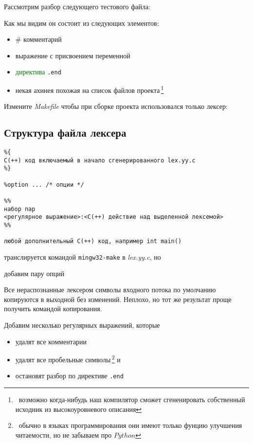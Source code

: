 \documentclass[oneside,10pt]{article}
\newcommand{\note}[1]{\,\footnote{\ #1}}
\newcommand{\term}[1]{\textcolor{green}{#1}}
\newcommand{\py}{$Python$}
\newcommand{\file}[1]{\textit{#1}}
\newcommand{\lst}[2]{}
\begin{document}
Рассмотрим разбор следующего тестового файла:
\lst{\file{src.src}: тест \#00}{doc/00.src}

\clearpage
Как мы видим он состоит из следующих элементов:
\begin{itemize}[nosep]
  \item \# комментарий
  \item выражение с присвоением переменной
  \item \term{директива} \verb|.end|
  \item некая ахинея похожая на список файлов проекта\note{возможно когда-нибудь
  наш компилятор сможет сгененировать собственный исходник из высокоуровневого
  описания}
\end{itemize}

\bigskip
Измените \file{Makefile} чтобы при сборке проекта использовался только лексер:
\lst{\file{Makefile}: изоляция лексера}{doc/01.mk}

\subsection{Структура файла лексера}

\begin{verbatim}
%{
С(++) код включаемый в начало сгенерированного lex.yy.c
%}

%option ... /* опции */

%%
набор пар
<регулярное выражение>:<С(++) действие над выделенной лексемой> 
%%

любой дополнительный С(++) код, например int main()
\end{verbatim}

\lst{\file{lpp.lpp}: пустой лексер}{doc/00.lpp}
транслируется командой \verb|mingw32-make| в \file{lex.yy.c}, но
\lst{\file{log.log}: ошибки}{doc/00.llg}

\clearpage
добавим пару опций
\lst{\file{lpp.lpp}: пустой лексер}{doc/01.lpp}
\lst{\file{log.log}: bypass исходного кода}{doc/01.llg}

Все нераспознанные лексером символы входного потока по умолчанию копируются в
выходной без изменений. Неплохо, но тот же результат проще получить командой
копирования.

\bigskip
Добавим несколько регулярных выражений, которые
\begin{itemize}
  \item удалят все комментарии
  \item удалят все пробельные символы\note{обычно в языках программирования они
  имеют только фунцию улучшения читаемости, но не забываем про \py} и
  \item остановят разбор по директиве \verb|.end|
\end{itemize}
\end{document}
